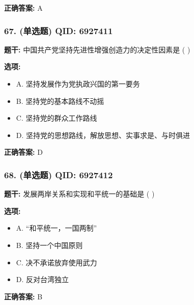 \documentclass[12pt,UTF8]{ctexart}
\begin{document}
\textbf{正确答案:}
A

\vspace{0.3em}\hrulefill\vspace{0.7em}

\subsubsection*{67. (单选题) \small QID: 6927411}

\textbf{题干:}
中国共产党坚持先进性增强创造力的决定性因素是 ( )

\textbf{选项:}
\begin{itemize}[leftmargin=*]

  \item A. 坚持发展作为党执政兴国的第一要务

  \item B. 坚持党的基本路线不动摇

  \item C. 坚持党的群众工作路线

  \item D. 坚持党的思想路线，解放思想、实事求是、与时俱进

\end{itemize}

\textbf{正确答案:}
D

\vspace{0.3em}\hrulefill\vspace{0.7em}

\subsubsection*{68. (单选题) \small QID: 6927412}

\textbf{题干:}
发展两岸关系和实现和平统一的基础是 ( )

\textbf{选项:}
\begin{itemize}[leftmargin=*]

  \item A. “和平统一，一国两制”

  \item B. 坚持一个中国原则

  \item C. 决不承诺放弃使用武力

  \item D. 反对台湾独立

\end{itemize}

\textbf{正确答案:}
B

\vspace{0.3em}\hrulefill\vspace{0.7em}
\end{document}
